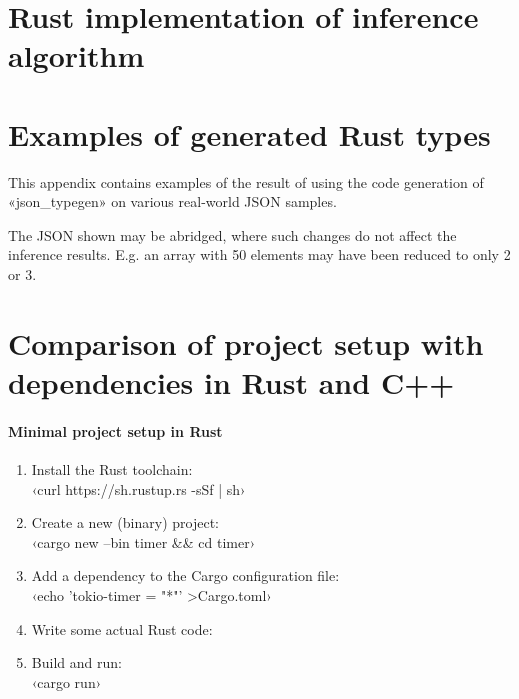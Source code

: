 
\appendix

\chapter{Rust implementation of inference algorithm}
\label{app:inference-code}

\newpage
{}
\newpage
{}

\fancyhfoffset[E,O]{0pt}

\chapter{Examples of generated Rust types}
\label{app:examples-generated-types}

This appendix contains examples of the result of using the code generation of «json_typegen» on various real-world JSON samples.

The JSON shown may be abridged, where such changes do not affect the inference results. E.g. an array with 50 elements may have been reduced to only 2 or 3.

\newpage

\newpage

\newpage


\restoregeometry{}
\fancyhfoffset[E,O]{0pt}

\chapter{Comparison of project setup with dependencies in Rust and C++}
\label{app:cargo-cpp-comparison}

\subsubsection{Minimal project setup in Rust}

\begin{enumerate}
  \item Install the Rust toolchain:\\
        ‹curl https://sh.rustup.rs -sSf | sh›
  \item Create a new (binary) project:\\
        ‹cargo new --bin timer && cd timer›
  \item Add a dependency to the Cargo configuration file:\\
        ‹echo 'tokio-timer = "*"' >Cargo.toml›
  \item Write some actual Rust code:\\
  \item Build and run:\\
        ‹cargo run›
\end{enumerate}

